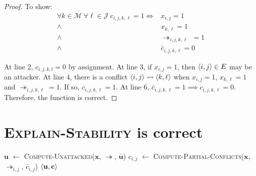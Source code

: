 \begin{proof}
	To show:
	\begin{align*}
		\forall k\in\mathcal{M}\ \forall\ell\in\mathcal{J}\ c_{i,j,k,\ell}=1\iff&x_{i,j}=1\\
		\land\ &x_{k,\ell}=1\\
		\land\ &\twoheadrightarrow_{i,j,k,\ell}\ =1\\
		\land\ &\bar{c}_{i,j,k,\ell}=0
	\end{align*}
	
	At line 2, $c_{i,j,k,l}=0$ by assignment. At line 3, if $x_{i,j}=1$, then $\langle{i},{j}\rangle\in E$ may be an attacker. At line 4, there is a conflict $\langle{i},{j}\rangle\rightsquigarrow\langle{k},{\ell}\rangle$ when $x_{i,j}=1$, $x_{k,\ell}=1$ and $\twoheadrightarrow_{i,j,k,\ell}=1$. If so, $c_{i,j,k,\ell}=1$. At line 6, $\bar{c}_{i,j,k,\ell}=1\implies c_{i,j,k,\ell}=0$. Therefore, the function is correct.

\end{proof}

\section{\textsc{Explain-Stability} is correct}

\begin{algorithm}[H]
	\begin{algorithmic}[1]
		\State $\mathbf{u}$ $\gets$ \textsc{Compute-Unattacked}($\mathbf{x}$, $\twoheadrightarrow$, $\bar{\mathbf{u}}$)
		\State $c_{i,j}$ $\gets$ \textsc{Compute-Partial-Conflicts}($\mathbf{x}$, $\twoheadrightarrow_{i,j}$, $\bar{c}_{i,j}$)
		\EndFor			
		\State \Return $\langle{\mathbf{u}},{\mathbf{c}}\rangle$
		\EndFunction
	\end{algorithmic}
\end{algorithm}

